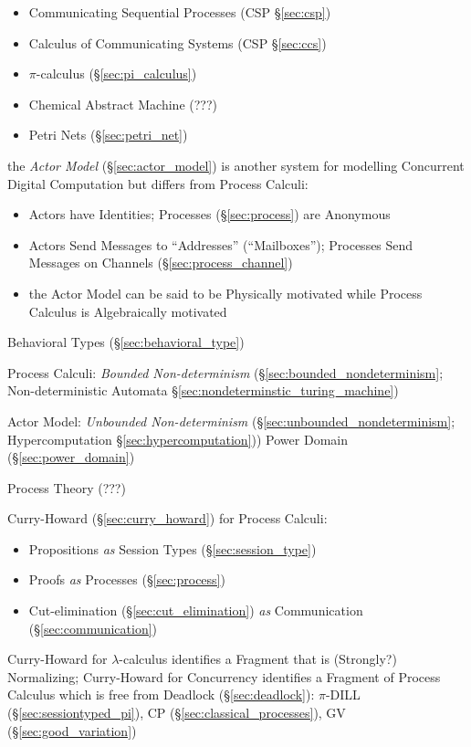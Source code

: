 \begin{itemize}
\item Communicating Sequential Processes (CSP \S\ref{sec:csp})
\item Calculus of Communicating Systems (CSP \S\ref{sec:ccs})
\item $\pi$-calculus (\S\ref{sec:pi_calculus})
\item Chemical Abstract Machine (???)
\item Petri Nets (\S\ref{sec:petri_net})
\end{itemize}

\fist the \emph{Actor Model} (\S\ref{sec:actor_model}) is
another system for modelling Concurrent Digital Computation but
differs from Process Calculi:
\begin{itemize}
  \item Actors have Identities; Processes (\S\ref{sec:process}) are
    Anonymous
  \item Actors Send Messages to ``Addresses'' (``Mailboxes'');
    Processes Send Messages on Channels (\S\ref{sec:process_channel})
  \item the Actor Model can be said to be Physically motivated while
    Process Calculus is Algebraically motivated
\end{itemize}

\fist Behavioral Types (\S\ref{sec:behavioral_type})

Process Calculi: \emph{Bounded Non-determinism}
(\S\ref{sec:bounded_nondeterminism}; \fist Non-deterministic Automata
\S\ref{sec:nondeterminstic_turing_machine})

Actor Model: \emph{Unbounded Non-determinism}
(\S\ref{sec:unbounded_nondeterminism}; \fist Hypercomputation
\S\ref{sec:hypercomputation})) Power Domain (\S\ref{sec:power_domain})

Process Theory (???)

Curry-Howard (\S\ref{sec:curry_howard}) for Process Calculi:
\begin{itemize}
  \item Propositions \emph{as} Session Types (\S\ref{sec:session_type})
  \item Proofs \emph{as} Processes (\S\ref{sec:process})
  \item Cut-elimination (\S\ref{sec:cut_elimination}) \emph{as}
    Communication (\S\ref{sec:communication})
\end{itemize}

Curry-Howard for $\lambda$-calculus identifies a Fragment that is
(Strongly?) Normalizing; Curry-Howard for Concurrency identifies a
Fragment of Process Calculus which is free from Deadlock
(\S\ref{sec:deadlock}): $\pi$-DILL
(\S\ref{sec:sessiontyped_pi}), CP
(\S\ref{sec:classical_processes}), GV (\S\ref{sec:good_variation})

